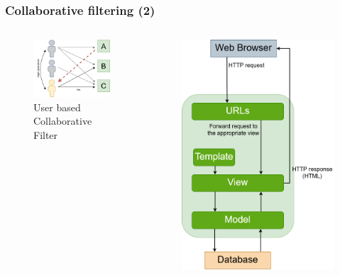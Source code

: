 \begin{frame}
    \frametitle{Collaborative filtering (2)}
    \begin{columns}
        \begin{column}{0.5\textwidth}
            \begin{figure}
                \centering
                \includegraphics[scale=0.5]{images/UB_CF_ex}
                \caption{User based Collaborative Filter}
            \end{figure}
        \end{column}
        \begin{column}{0.5\textwidth}
            \begin{figure}
                \centering
                \includegraphics[scale=0.5]{images/IB_CF_ex}

\end{figure}
\end{column}
\end{columns}
\end{frame}
